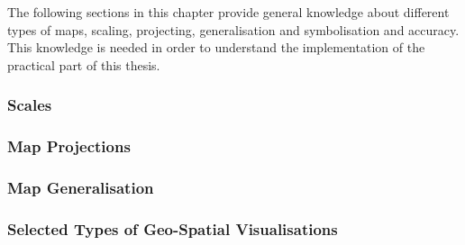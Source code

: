 The following sections in this chapter provide general knowledge about different types of maps, scaling, projecting, generalisation and symbolisation and accuracy. This knowledge is needed in order to understand the implementation of the practical part of this thesis.

\subsubsection{Scales}
\label{s:map-scale}


\subsubsection{Map Projections}

\label{s:map-projections}

\newpage
\subsubsection{Map Generalisation}


\subsubsection{Selected Types of Geo-Spatial Visualisations}
\label{s:univariate-maps}
